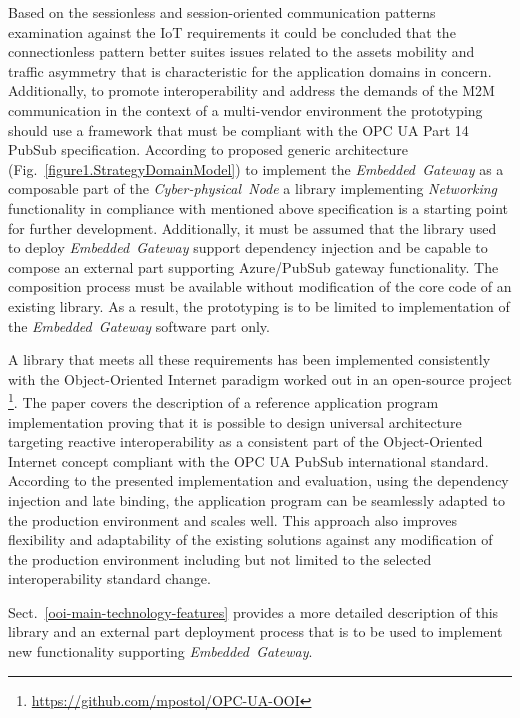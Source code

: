 \documentclass{jacsart}
\begin{document}
Based on the sessionless and session-oriented communication patterns examination against the IoT requirements \cite{mpostol2020} it could be concluded that the connectionless pattern better suites issues related to the assets mobility and traffic asymmetry that is characteristic for the application domains in concern. Additionally, to promote interoperability and address the demands of the M2M communication in the context of a multi-vendor environment the prototyping should use a framework that must be compliant with the OPC UA Part 14 PubSub \cite{RefWorks:doc:5d98837de4b055984c0eecf0} specification. According to proposed generic architecture (Fig.~\ref*{figure1.StrategyDomainModel}) to implement the \textit{Embedded\ Gateway} as a composable part of the \textit{Cyber-physical\ Node} a library implementing \textit{Networking} functionality in compliance with mentioned above specification is a starting point for further development. Additionally, it must be assumed that the library used to deploy \textit{Embedded\ Gateway} support dependency injection and be capable to compose an external part supporting Azure/PubSub gateway functionality. The composition process must be available without modification of the core code of an existing library. As a result, the prototyping is to be limited to implementation of the \textit{Embedded\ Gateway} software part only.

A library that meets all these requirements has been implemented consistently with the Object-Oriented Internet paradigm \cite{RefWorks:doc:5c66740ae4b081adf5804596} worked out in an open-source project \footnote{ \url{https://github.com/mpostol/OPC-UA-OOI} }. The paper \cite{mpostol2020} covers the description of a reference application program implementation proving that it is possible to design universal architecture targeting reactive interoperability as a consistent part of the Object-Oriented Internet concept compliant with the OPC UA PubSub \cite{RefWorks:doc:5d98837de4b055984c0eecf0} international standard. According to the presented implementation and evaluation, using the dependency injection and late binding, the application program can be seamlessly adapted to the production environment and scales well. This approach also improves flexibility and adaptability of the existing solutions against any modification of the production environment including but not limited to the selected interoperability standard change.

Sect.~\ref*{ooi-main-technology-features} provides a more detailed description of this library and an external part deployment process that is to be used to implement new functionality supporting \textit{Embedded\ Gateway}.
\end{document}
